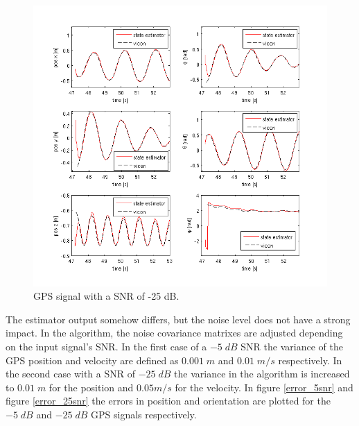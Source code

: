 \begin{figure}[hb]
\centering
\includegraphics[width=1\textwidth]{pictures/2_2_SNR25_detail_GPS.png}
\caption{GPS signal with a SNR of -25 dB.}
\label{detail_25snr}
\end{figure}
The estimator output somehow differs, but the noise level does not have a strong impact. In the algorithm, the noise covariance matrixes are adjusted depending on the input signal's SNR. In the first case of a $-5\; dB$ SNR the variance of the GPS position and velocity are defined as $0.001\;m$ and $0.01\;m/s$ respectively. In the second case with a SNR of $-25\; dB$ the variance in the algorithm is increased to $0.01\;m$ for the position and $0.05 m/s$ for the velocity.
In figure \ref{error_5snr} and figure \ref{error_25snr} the errors in position and orientation are plotted for the $-5\; dB$ and $-25\; dB$ GPS signals respectively. 

